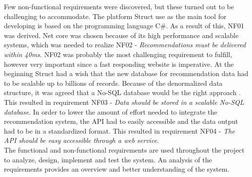 Few non-functional requirements were discovered, but these turned out to be challenging to accommodate. The platform Struct use as the main tool for developing is based on the programming language C\#. As a result of this, NF01 was derived. Net core was chosen because of its high performance and scalable systems, which was needed to realize NF02 - \textit{Recommendations must be delivered within 40ms}.\cite{NetCore}
NF02 was probably the most challenging requirement to fulfill, however very important since a fast responding website is imperative. At the beginning Struct had a wish that the new database for recommendation data had to be scalable up to billions of records. Because of the denormalized data structure, it was agreed that a No-SQL database would be the right approach \cite{NoSQLScalability}. This resulted in requirement NF03 - \textit{Data should be stored in a scalable No-SQL database}. In order to lower the amount of effort needed to integrate the recommendation system, the API had to easily accessible and the data output had to be in a standardized format. This resulted in requirement NF04 - \textit{The API should be easy accessible through a web service}.\\
The functional and non-functional requirements are used throughout the project to analyze, design, implement and test the system. An analysis of the requirements provides an overview and better understanding of the system.
